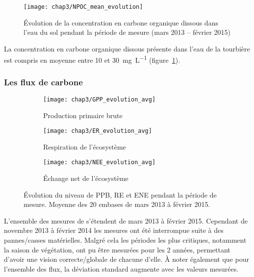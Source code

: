 \begin{figure}
\centering
\texttt{[image: chap3/NPOC\_mean\_evolution]}
\caption{Évolution de la concentration en carbone organique dissous dans l'eau du sol pendant la période de mesure (mars 2013 -- février 2015)}
\label{fig:NPOC_mean_evolution}
\end{figure}

La concentration en carbone organique dissous présente dans l'eau de la tourbière est compris en moyenne entre \num{10} et \SI{30}{\milli\gram\per\liter} (figure~\ref{fig:NPOC_mean_evolution}).


\subsubsection{Les flux de carbone}

\begin{figure}
	\centering
	\begin{subfigure}[t]{\textwidth}
		\centering
		\texttt{[image: chap3/GPP\_evolution\_avg]}
		\caption{Production primaire brute}
		\label{fig:GPP_evolution_avg}
	\end{subfigure}%
	
	\begin{subfigure}[t]{\textwidth}
		\centering
		\texttt{[image: chap3/ER\_evolution\_avg]}
		\caption{Respiration de l'écosystème}
		\label{fig:ER_evolution_avg}
	\end{subfigure}
	
	\begin{subfigure}[t]{\textwidth}
		\centering
		\texttt{[image: chap3/NEE\_evolution\_avg]}
		\caption{Échange net de l'écosystème}
		\label{fig:NEE_evolution_avg}
	\end{subfigure}
\caption{Évolution du niveau de PPB, RE et ENE pendant la période de mesure. Moyenne des 20 embases de mars 2013 à février 2015.}
\label{fig:flux_evolution_avg}
\end{figure}

L'ensemble des mesures de \coo s'étendent de mars 2013 à février 2015.
Cependant de novembre 2013 à février 2014 les mesures ont été interrompue suite à des pannes/casses matérielles.
Malgré cela les périodes les plus critiques, notamment la saison de végétation, ont pu être mesurées pour les 2 années, permettant d'avoir une vision correcte/globale de chacune d'elle.
À noter également que pour l'ensemble des flux, la déviation standard augmente avec les valeurs mesurées.

